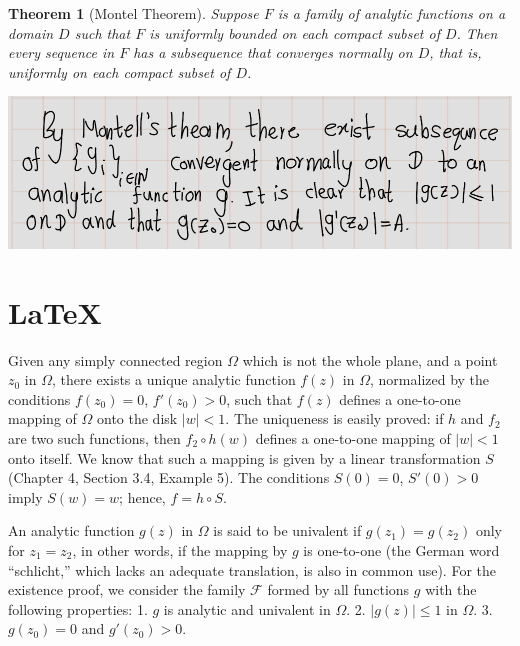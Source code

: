 \documentclass[
]{book}
\newtheorem{theorem}{Theorem}[chapter]
\theoremstyle{definition}
\theoremstyle{definition}
\theoremstyle{definition}
\theoremstyle{definition}
\theoremstyle{remark}
\begin{document}
\begin{theorem}[Montel Theorem]
\protect\hypertarget{thm:unnamed-chunk-56}{}\label{thm:unnamed-chunk-56}Suppose \(F\) is a family of analytic functions on a domain \(D\) such that \(F\) is uniformly bounded on each compact subset of \(D\). Then every sequence in \(F\) has a subsequence that converges normally on \(D\), that is, uniformly on each compact subset of \(D\).
\end{theorem}

\begin{center}\includegraphics[width=14in]{figures/Riemann_Mapping_Therom/fig13} \end{center}

\section{LaTeX}\label{latex}

Given any simply connected region \(\Omega\) which is not the whole plane, and a point \(z_0\) in \(\Omega\), there exists a unique analytic function \(f(z)\) in \(\Omega\), normalized by the conditions \(f(z_0) = 0\), \(f'(z_0) > 0\), such that \(f(z)\) defines a one-to-one mapping of \(\Omega\) onto the disk \(|w| < 1\). The uniqueness is easily proved: if \(h\) and \(f_2\) are two such functions, then \(f_2 \circ h(w)\) defines a one-to-one mapping of \(|w| < 1\) onto itself. We know that such a mapping is given by a linear transformation \(S\) (Chapter 4, Section 3.4, Example 5). The conditions \(S(0) = 0\), \(S'(0) > 0\) imply \(S(w) = w\); hence, \(f = h \circ S\).

An analytic function \(g(z)\) in \(\Omega\) is said to be univalent if \(g(z_1) = g(z_2)\) only for \(z_1 = z_2\), in other words, if the mapping by \(g\) is one-to-one (the German word ``schlicht,'' which lacks an adequate translation, is also in common use). For the existence proof, we consider the family \(\mathcal{F}\) formed by all functions \(g\) with the following properties:
1. \(g\) is analytic and univalent in \(\Omega\).
2. \(|g(z)| \leq 1\) in \(\Omega\).
3. \(g(z_0) = 0\) and \(g'(z_0) > 0\).
\end{document}
